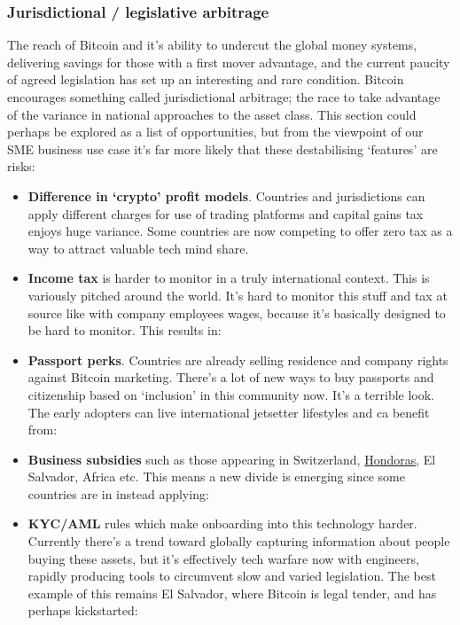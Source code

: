 \begin{itemize}
\subsubsection{Jurisdictional / legislative  arbitrage}
The reach of Bitcoin and it's ability to undercut the global money systems, delivering savings for those with a first mover advantage, and the current paucity of agreed legislation has set up an interesting and rare condition. Bitcoin encourages something called jurisdictional arbitrage; the race to take advantage of the variance in national approaches to the asset class. This section could perhaps be explored as a list of opportunities, but from the viewpoint of our SME business use case it's far more likely that these destabilising `features' are risks: 
\begin{itemize}
\item \textbf{Difference in `crypto' profit models}. Countries and jurisdictions can apply different charges for use of trading platforms and capital gains tax enjoys huge variance. Some countries are now competing to offer zero tax as a way to attract valuable tech mind share. 
\item \textbf{Income tax} is harder to monitor in a truly international context. This is variously pitched around the world.  It's hard to monitor this stuff and tax at source like with company employees wages, because it's basically designed to be hard to monitor. This results in:
\item \textbf{Passport perks}. Countries are already selling residence and company rights against Bitcoin marketing. There's a lot of new ways to buy passports and citizenship based on `inclusion' in this community now. It's a terrible look. The early adopters can live international jetsetter lifestyles and ca benefit from:
\item \textbf{Business subsidies} such as those appearing in Switzerland, \href{https://davisclute.medium.com/visiting-a-startup-city-in-honduras-73d9c026ee6d}{Hondoras}, El Salvador, Africa etc. This means a new divide is emerging since some countries are in instead applying:
\item \textbf{KYC/AML} rules which make onboarding into this technology harder. Currently there's a trend toward globally capturing information about people buying these assets, but it's effectively tech warfare now with engineers, rapidly producing tools to circumvent slow and varied legislation. The best example of this remains El Salvador, where Bitcoin is legal tender, and has perhaps kickstarted:

\end{itemize}
\end{itemize}
